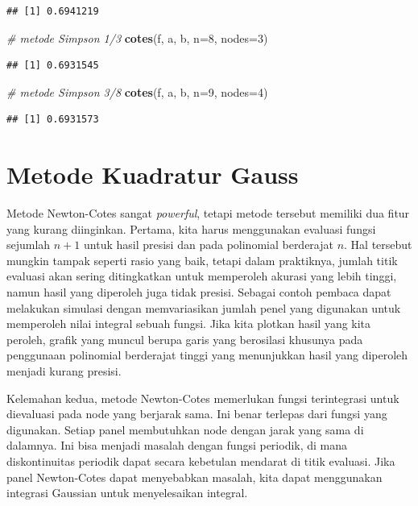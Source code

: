 \documentclass[]{book}
\newenvironment{Shaded}{\begin{snugshade}}{\end{snugshade}}
\newcommand{\CommentTok}[1]{\textcolor[rgb]{0.56,0.35,0.01}{\textit{#1}}}
\newcommand{\DataTypeTok}[1]{\textcolor[rgb]{0.13,0.29,0.53}{#1}}
\newcommand{\DecValTok}[1]{\textcolor[rgb]{0.00,0.00,0.81}{#1}}
\newcommand{\KeywordTok}[1]{\textcolor[rgb]{0.13,0.29,0.53}{\textbf{#1}}}
\newcommand{\NormalTok}[1]{#1}
\theoremstyle{definition}
\theoremstyle{definition}
\theoremstyle{definition}
\theoremstyle{remark}
\begin{document}
\begin{verbatim}
## [1] 0.6941219
\end{verbatim}

\begin{Shaded}
\begin{Highlighting}[]
\CommentTok{# metode Simpson 1/3}
\KeywordTok{cotes}\NormalTok{(f, a, b, }\DataTypeTok{n=}\DecValTok{8}\NormalTok{, }\DataTypeTok{nodes=}\DecValTok{3}\NormalTok{)}
\end{Highlighting}
\end{Shaded}

\begin{verbatim}
## [1] 0.6931545
\end{verbatim}

\begin{Shaded}
\begin{Highlighting}[]
\CommentTok{# metode Simpson 3/8}
\KeywordTok{cotes}\NormalTok{(f, a, b, }\DataTypeTok{n=}\DecValTok{9}\NormalTok{, }\DataTypeTok{nodes=}\DecValTok{4}\NormalTok{)}
\end{Highlighting}
\end{Shaded}

\begin{verbatim}
## [1] 0.6931573
\end{verbatim}

\hypertarget{kuadgauss}{%
\section{Metode Kuadratur Gauss}\label{kuadgauss}}

Metode Newton-Cotes sangat \emph{powerful}, tetapi metode tersebut memiliki dua fitur yang kurang diinginkan. Pertama, kita harus menggunakan evaluasi fungsi sejumlah \(n +1\) untuk hasil presisi dan pada polinomial berderajat \(n\). Hal tersebut mungkin tampak seperti rasio yang baik, tetapi dalam praktiknya, jumlah titik evaluasi akan sering ditingkatkan untuk memperoleh akurasi yang lebih tinggi, namun hasil yang diperoleh juga tidak presisi. Sebagai contoh pembaca dapat melakukan simulasi dengan memvariasikan jumlah penel yang digunakan untuk memperoleh nilai integral sebuah fungsi. Jika kita plotkan hasil yang kita peroleh, grafik yang muncul berupa garis yang berosilasi khusunya pada penggunaan polinomial berderajat tinggi yang menunjukkan hasil yang diperoleh menjadi kurang presisi.

Kelemahan kedua, metode Newton-Cotes memerlukan fungsi terintegrasi untuk dievaluasi pada node yang berjarak sama. Ini benar terlepas dari fungsi yang digunakan. Setiap panel membutuhkan node dengan jarak yang sama di dalamnya. Ini bisa menjadi masalah dengan fungsi periodik, di mana diskontinuitas periodik dapat secara kebetulan mendarat di titik evaluasi. Jika panel Newton-Cotes dapat menyebabkan masalah, kita dapat menggunakan integrasi Gaussian untuk menyelesaikan integral.
\end{document}
